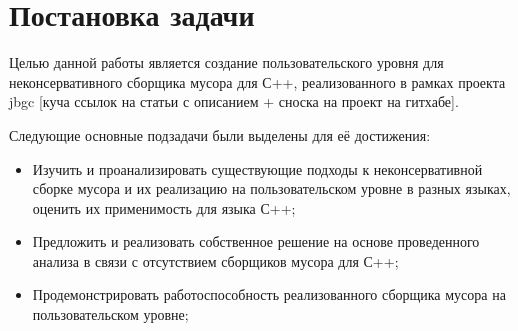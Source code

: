 \section{Постановка задачи}
Целью данной работы является создание пользовательского уровня для неконсервативного сборщика мусора для С++, реализованного в рамках проекта jbgc [куча ссылок на статьи с описанием + сноска на проект на гитхабе].


\vspace{0.3cm}
 Следующие основные подзадачи были выделены для её достижения:
\begin{itemize}
\item Изучить и проанализировать существующие подходы к неконсервативной сборке мусора и их реализацию на пользовательском уровне в разных языках, оценить их применимость для языка С++;
\item Предложить и реализовать собственное решение на основе проведенного анализа в связи с отсутствием сборщиков мусора для С++;
\item Продемонстрировать работоспособность реализованного сборщика мусора на пользовательском уровне;

\end{itemize}
